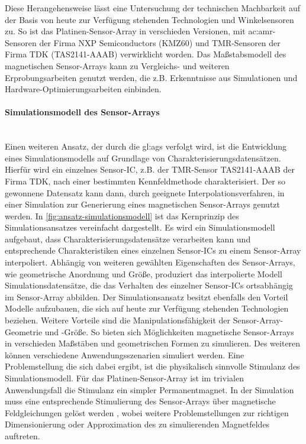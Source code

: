\clearpage


Diese Herangehensweise lässt eine Untersuchung der technischen Machbarkeit auf der Basis von heute zur Verfügung stehenden Technologien und Winkelsensoren zu.
So ist das Platinen-Sensor-Array in verschieden Versionen, mit \gls{ac:amr}-Sensoren der Firma NXP Semiconductors 
(KMZ60) \cite{NXPSemiconductors2014} und TMR-Sensoren der Firma TDK (TAS2141-AAAB) \cite{TDK2016} verwirklicht worden. 
Das Maßstabsmodell des magnetischen Sensor-Arrays kann zu Vergleichs- und weiteren Erprobungsarbeiten genutzt werden, 
die z.B. Erkenntnisse aus Simulationen und Hardware-Optimierungsarbeiten einbinden.


\paragraph{Simulationsmodell des Sensor-Arrays}\label{par:simulationsmodell-des-sensor-arrays}$~$\\


Einen weiteren Ansatz, der durch die \gls{gl:ags} verfolgt wird, ist die Entwicklung eines Simulationsmodells auf 
Grundlage von Charakterisierungsdatensätzen. Hierfür wird ein einzelnes Sensor-IC, z.B. der TMR-Sensor TAS2141-AAAB der 
Firma TDK, nach einer bestimmten Kennfeldmethode \cite{Schuethe2019} charakterisiert. Der so gewonnene Datensatz kann 
dann, durch geeignete Interpolationsverfahren, in einer Simulation zur Generierung eines magnetischen Sensor-Arrays 
genutzt werden. In \autoref{fig:ansatz-simulationsmodell} ist das Kernprinzip des Simulationsansatzes vereinfacht 
dargestellt. Es wird ein Simulationsmodell aufgebaut, dass Charakterisierungsdatensätze verarbeiten kann und 
entsprechende Charakteristiken eines einzelnen Sensor-ICs zu einem Sensor-Array interpoliert. Abhängig von weiteren 
gewählten Eigenschaften des Sensor-Arrays, wie geometrische Anordnung und Größe, produziert das interpolierte Modell 
Simulationsdatensätze, die das Verhalten des einzelner Sensor-ICs ortsabhängig im Sensor-Array abbilden.
\newline
Der Simulationsansatz besitzt ebenfalls den Vorteil Modelle aufzubauen, die sich auf heute zur Verfügung stehenden Technologien beziehen. Weitere Vorteile sind die Manipulationsfähigkeit der Sensor-Array-Geometrie und -Größe. So bieten sich Möglichkeiten magnetische Sensor-Arrays in verschieden Maßstäben und geometrischen Formen zu simulieren. Des weiteren können verschiedene Anwendungsszenarien simuliert werden. Eine Problemstellung die sich dabei ergibt, ist die physikalisch sinnvolle Stimulanz des Simulationsmodell. Für das Platinen-Sensor-Array ist im trivialen Anwendungsfall die Stimulanz ein simpler Permanentmagnet. In der Simulation muss eine entsprechende Stimulierung des Sensor-Arrays über magnetische Feldgleichungen gelöst werden \cite{Pape2017}\cite{Schuethe2019}, wobei weitere Problemstellungen zur richtigen Dimensionierung oder Approximation des zu simulierenden Magnetfeldes auftreten.


